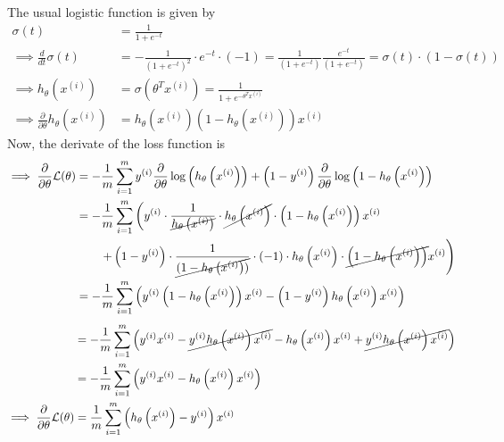 The usual logistic function is given by
\begin{align*}
    \sigma\left(t\right)
     & =
    \frac{1}{1+e^{-t}}
    \\
    \implies
    \frac{d}{dt} \sigma\left(t\right)
     & =
    -\frac{1}{{\left(1+e^{-t}\right)}^2} \cdot e^{-t} \cdot (-1)
    =
    \frac{1}{\left(1+e^{-t}\right)}
    \frac{e^{-t}}{\left(1+e^{-t}\right)}
    =
    \sigma\left(t\right) \cdot \left(1-\sigma\left(t\right)\right)
    \\
    \implies
    h_{\theta}\left(x^{(i)}\right)
     & =
    \sigma\left(\theta^{T} x^{(i)}\right)
    =
    \frac{1}{1+e^{-\theta^{T} x^{(i)}}}
    \\
    \implies
    \frac{\partial}{\partial \theta} h_{\theta}\left(x^{(i)}\right)
     & =
    h_{\theta}\left(x^{(i)}\right) \left(1-h_{\theta}\left(x^{(i)}\right)\right) x^{(i)}
\end{align*}
Now, the derivate of the loss function is
\begin{align*}
    \implies
    \frac{\partial}{\partial \theta} \mathcal{L}(\theta)
     & =
    -\frac{1}{m} \sum_{i=1}^{m}
    y^{(i)} \frac{\partial}{\partial \theta} \log \left(h_{\theta}\left(x^{(i)}\right)\right)
    +
    \left(1-y^{(i)}\right) \frac{\partial}{\partial \theta} \log \left(1-h_{\theta}\left(x^{(i)}\right)\right)
    \\ & =
    -\frac{1}{m} \sum_{i=1}^{m}
    \left(
    y^{(i)}
    \cdot \frac{1}{\cancel{h_{\theta}\left(x^{(i)}\right)}}
    \cdot \cancel{h_{\theta}\left(x^{(i)}\right)}
    \cdot \left(1-h_{\theta}\left(x^{(i)}\right)\right)
    x^{(i)}
    \right.
    \\ & \qquad
    \left.
    +
    \left(1-y^{(i)}\right)
    \cdot \frac{1}{\cancel{(1-h_{\theta}\left(x^{(i)}\right))}}
    \cdot (-1)
    \cdot h_{\theta}\left(x^{(i)}\right)
    \cdot \cancel{\left(1-h_{\theta}\left(x^{(i)}\right)\right)}
    x^{(i)}
    \right)
    \\ & =
    -\frac{1}{m} \sum_{i=1}^{m}
    \left(
    y^{(i)} \left(1-h_{\theta}\left(x^{(i)}\right)\right) x^{(i)}
    -
    \left(1-y^{(i)}\right) h_{\theta}\left(x^{(i)}\right) x^{(i)}
    \right)
\end{align*}
\begin{align*}
     & =
    -\frac{1}{m} \sum_{i=1}^{m}
    \Big(
    y^{(i)} x^{(i)}
    -
    \cancel{y^{(i)} h_{\theta}\left(x^{(i)}\right) x^{(i)}}
    -
    h_{\theta}\left(x^{(i)}\right) x^{(i)}
    +
    \cancel{y^{(i)} h_{\theta}\left(x^{(i)}\right) x^{(i)}}
    \Big)
    \\ & =
    -\frac{1}{m} \sum_{i=1}^{m}
    \left(
    y^{(i)} x^{(i)}
    -
    h_{\theta}\left(x^{(i)}\right) x^{(i)}
    \right)
    \\
    \implies
    \frac{\partial}{\partial \theta} \mathcal{L}(\theta)
     & =
    \frac{1}{m} \sum_{i=1}^{m}
    \left(
    h_{\theta}\left(x^{(i)}\right)
    -
    y^{(i)}
    \right)
    x^{(i)}
\end{align*}

